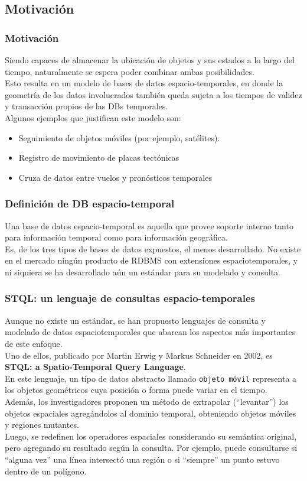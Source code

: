 
\subsection{Motivación}

\begin{frame}
	\frametitle{Motivación}
	Siendo capaces de almacenar la ubicación de objetos y sus estados a lo largo del tiempo, naturalmente se espera poder combinar ambas posibilidades. \pause \\
	Esto resulta en un modelo de bases de datos espacio-temporales, en donde la geometría de los datos involucrados también queda sujeta a los tiempos de validez y transacción propios de las DBs temporales. \pause \\
Algunos ejemplos que justifican este modelo son: \pause
	\begin{itemize}
	\item	Seguimiento de objetos móviles (por ejemplo, satélites). \pause
	\item	Registro de movimiento de placas tectónicas \pause
	\item	Cruza de datos entre vuelos y pronósticos temporales
	\end{itemize}
\end{frame}

\begin{frame}
	\frametitle{Definición de DB espacio-temporal}
	Una base de datos espacio-temporal es aquella que provee soporte interno tanto para información temporal como para información geográfica. \pause \\
	Es, de los tres tipos de bases de datos expuestos, el menos desarrollado. No existe en el mercado ningún producto de RDBMS con extensiones espaciotemporales, y ni siquiera se ha desarrollado aún un estándar para su modelado y consulta.
\end{frame}

\begin{frame}
	\frametitle{STQL: un lenguaje de consultas espacio-temporales}
	Aunque no existe un estándar, se han propuesto lenguajes de consulta y modelado de datos espaciotemporales que abarcan los aspectos más importantes de este enfoque. \pause \\
	Uno de ellos, publicado por Martin Erwig y Markus Schneider en 2002, es \textbf{STQL: a Spatio-Temporal Query Language}. \pause \\
	En este lenguaje, un tipo de datos abstracto llamado \texttt{objeto móvil} representa a los objetos geométricos cuya posición o forma puede variar en el tiempo. \\
	Además, los investigadores proponen un método de extrapolar (``levantar'') los objetos espaciales agregándolos al dominio temporal, obteniendo objetos móviles y regiones mutantes. \pause \\
	Luego, se redefinen los operadores espaciales considerando su semántica original, pero agregando su resultado según la consulta. Por ejemplo, puede consultarse si ``alguna vez'' una línea intersectó una región o si ``siempre'' un punto estuvo dentro de un polígono.
\end{frame}

